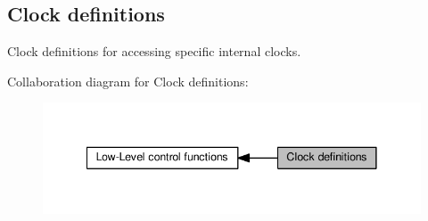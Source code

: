 \subsection{Clock definitions}
\label{group__LMS__CLOCK__ID}


Clock definitions for accessing specific internal clocks.  


Collaboration diagram for Clock definitions\+:
\nopagebreak
\begin{figure}[H]
\begin{center}
\leavevmode
\includegraphics[width=341pt]{d7/d10/group__LMS__CLOCK__ID}
\end{center}
\end{figure}

